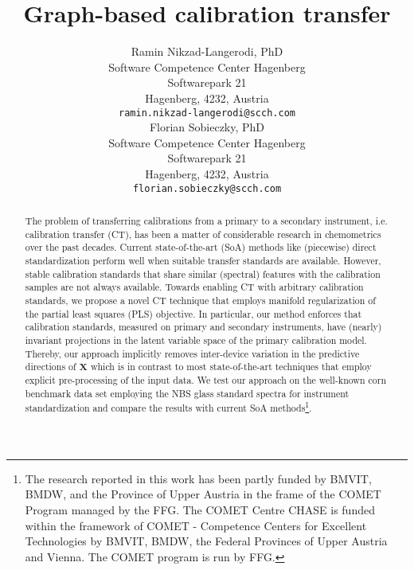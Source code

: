 \documentclass{article}
\title{Graph-based calibration transfer}
\author{
  Ramin Nikzad-Langerodi, PhD\\
  Software Competence Center Hagenberg\\
  Softwarepark 21\\
  Hagenberg, 4232, Austria\\
  \texttt{ramin.nikzad-langerodi@scch.com} \\
   \And
  Florian Sobieczky, PhD\\
  Software Competence Center Hagenberg\\
  Softwarepark 21\\
  Hagenberg, 4232, Austria\\
  \texttt{florian.sobieczky@scch.com}
}
\let\vec\mathbf
\begin{document}
\maketitle

\begin{abstract}
The problem of transferring calibrations from a primary to a secondary instrument, i.e. calibration transfer (CT), has been a matter of considerable research in chemometrics over the past decades. Current state-of-the-art (SoA) methods like (piecewise) direct standardization perform well when suitable transfer standards are available. However, stable calibration standards that share similar (spectral) features with the calibration samples are not always available. Towards enabling CT with arbitrary calibration standards, we propose a novel CT technique that employs manifold regularization of the partial least squares (PLS) objective. In particular, our method enforces that calibration standards, measured on primary and secondary instruments, have (nearly) invariant projections in the latent variable space of the primary calibration model. Thereby, our approach implicitly removes inter-device variation in the predictive directions of $\vec X$ which is in contrast to most state-of-the-art techniques that employ explicit pre-processing of the input data. We test our approach on the well-known corn benchmark data set employing the NBS glass standard spectra for instrument standardization and compare the results with current SoA methods\footnote{The research reported in this work has been partly funded by BMVIT, BMDW, and the Province of Upper Austria in the frame of the COMET Program managed by the FFG. The COMET Centre CHASE is funded within the framework of COMET - Competence Centers for Excellent Technologies by BMVIT, BMDW, the Federal Provinces of Upper Austria and Vienna. The COMET program is run by FFG.}.  
\end{abstract}


\end{document}
